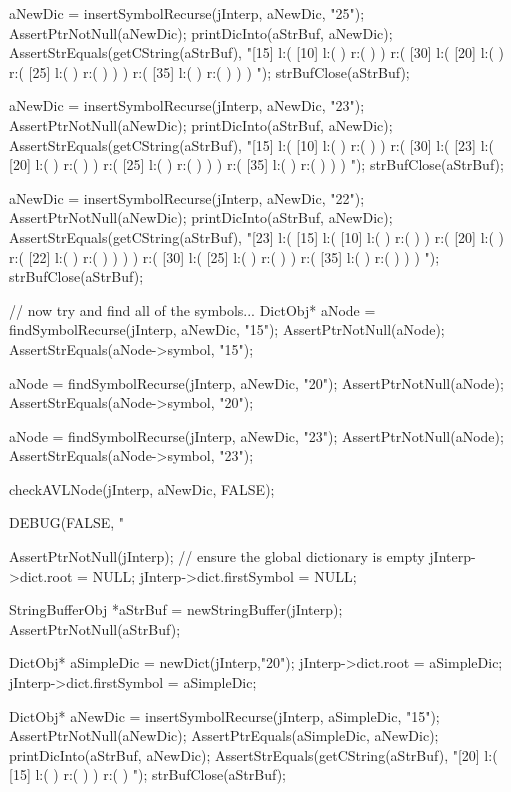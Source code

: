   aNewDic = insertSymbolRecurse(jInterp, aNewDic, "25");
  AssertPtrNotNull(aNewDic);
  printDicInto(aStrBuf, aNewDic);
  AssertStrEquals(getCString(aStrBuf),
  "[15] l:( [10] l:(  ) r:(  )  ) r:( [30] l:( [20] l:(  ) r:( [25] l:(  ) r:(  )  )  ) r:( [35] l:(  ) r:(  )  )  ) ");
  strBufClose(aStrBuf);

  aNewDic = insertSymbolRecurse(jInterp, aNewDic, "23");
  AssertPtrNotNull(aNewDic);
  printDicInto(aStrBuf, aNewDic);
  AssertStrEquals(getCString(aStrBuf),
  "[15] l:( [10] l:(  ) r:(  )  ) r:( [30] l:( [23] l:( [20] l:(  ) r:(  )  ) r:( [25] l:(  ) r:(  )  )  ) r:( [35] l:(  ) r:(  )  )  ) ");
  strBufClose(aStrBuf);
  
  aNewDic = insertSymbolRecurse(jInterp, aNewDic, "22");
  AssertPtrNotNull(aNewDic);
  printDicInto(aStrBuf, aNewDic);
  AssertStrEquals(getCString(aStrBuf),
  "[23] l:( [15] l:( [10] l:(  ) r:(  )  ) r:( [20] l:(  ) r:( [22] l:(  ) r:(  )  )  )  ) r:( [30] l:( [25] l:(  ) r:(  )  ) r:( [35] l:(  ) r:(  )  )  ) ");
  strBufClose(aStrBuf);
  
  // now try and find all of the symbols...
  DictObj* aNode = findSymbolRecurse(jInterp, aNewDic, "15");
  AssertPtrNotNull(aNode);
  AssertStrEquals(aNode->symbol, "15");

  aNode = findSymbolRecurse(jInterp, aNewDic, "20");
  AssertPtrNotNull(aNode);
  AssertStrEquals(aNode->symbol, "20");

  aNode = findSymbolRecurse(jInterp, aNewDic, "23");
  AssertPtrNotNull(aNode);
  AssertStrEquals(aNode->symbol, "23");

  checkAVLNode(jInterp, aNewDic, FALSE);
\stopCTest
\stopTestCase


\startCTest
  DEBUG(FALSE, "\n%

  AssertPtrNotNull(jInterp);
  // ensure the global dictionary is empty
  jInterp->dict.root        = NULL;
  jInterp->dict.firstSymbol = NULL;

  StringBufferObj *aStrBuf = newStringBuffer(jInterp);
  AssertPtrNotNull(aStrBuf);
  
  DictObj* aSimpleDic = newDict(jInterp,"20");
  jInterp->dict.root        = aSimpleDic;
  jInterp->dict.firstSymbol = aSimpleDic;

  DictObj* aNewDic = insertSymbolRecurse(jInterp, aSimpleDic, "15");
  AssertPtrNotNull(aNewDic);
  AssertPtrEquals(aSimpleDic, aNewDic);
  printDicInto(aStrBuf, aNewDic);
  AssertStrEquals(getCString(aStrBuf),
  "[20] l:( [15] l:(  ) r:(  )  ) r:(  ) ");
  strBufClose(aStrBuf);
  
